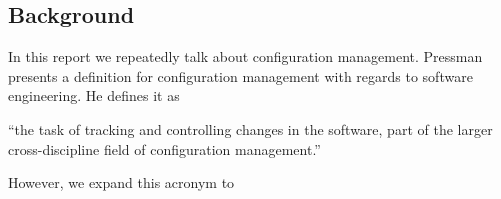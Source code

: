 \subsection{Background}\label{sec:background}
In this report we repeatedly talk about configuration management. Pressman \cite{pressman2005software} presents a definition for configuration management with regards to software engineering. He defines it as

``the task of tracking and controlling changes in the software, part of the larger cross-discipline field of configuration management.''

However, we expand this acronym to 
